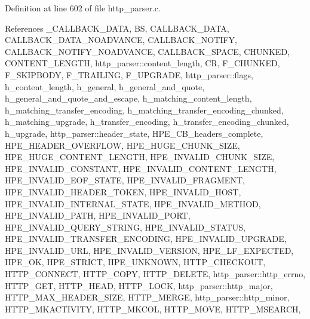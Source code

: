 Definition at line 602 of file http\+\_\+parser.\+c.



References \+\_\+\+C\+A\+L\+L\+B\+A\+C\+K\+\_\+\+D\+A\+TA, BS, C\+A\+L\+L\+B\+A\+C\+K\+\_\+\+D\+A\+TA, C\+A\+L\+L\+B\+A\+C\+K\+\_\+\+D\+A\+T\+A\+\_\+\+N\+O\+A\+D\+V\+A\+N\+CE, C\+A\+L\+L\+B\+A\+C\+K\+\_\+\+N\+O\+T\+I\+FY, C\+A\+L\+L\+B\+A\+C\+K\+\_\+\+N\+O\+T\+I\+F\+Y\+\_\+\+N\+O\+A\+D\+V\+A\+N\+CE, C\+A\+L\+L\+B\+A\+C\+K\+\_\+\+S\+P\+A\+CE, C\+H\+U\+N\+K\+ED, C\+O\+N\+T\+E\+N\+T\+\_\+\+L\+E\+N\+G\+TH, http\+\_\+parser\+::content\+\_\+length, CR, F\+\_\+\+C\+H\+U\+N\+K\+ED, F\+\_\+\+S\+K\+I\+P\+B\+O\+DY, F\+\_\+\+T\+R\+A\+I\+L\+I\+NG, F\+\_\+\+U\+P\+G\+R\+A\+DE, http\+\_\+parser\+::flags, h\+\_\+content\+\_\+length, h\+\_\+general, h\+\_\+general\+\_\+and\+\_\+quote, h\+\_\+general\+\_\+and\+\_\+quote\+\_\+and\+\_\+escape, h\+\_\+matching\+\_\+content\+\_\+length, h\+\_\+matching\+\_\+transfer\+\_\+encoding, h\+\_\+matching\+\_\+transfer\+\_\+encoding\+\_\+chunked, h\+\_\+matching\+\_\+upgrade, h\+\_\+transfer\+\_\+encoding, h\+\_\+transfer\+\_\+encoding\+\_\+chunked, h\+\_\+upgrade, http\+\_\+parser\+::header\+\_\+state, H\+P\+E\+\_\+\+C\+B\+\_\+headers\+\_\+complete, H\+P\+E\+\_\+\+H\+E\+A\+D\+E\+R\+\_\+\+O\+V\+E\+R\+F\+L\+OW, H\+P\+E\+\_\+\+H\+U\+G\+E\+\_\+\+C\+H\+U\+N\+K\+\_\+\+S\+I\+ZE, H\+P\+E\+\_\+\+H\+U\+G\+E\+\_\+\+C\+O\+N\+T\+E\+N\+T\+\_\+\+L\+E\+N\+G\+TH, H\+P\+E\+\_\+\+I\+N\+V\+A\+L\+I\+D\+\_\+\+C\+H\+U\+N\+K\+\_\+\+S\+I\+ZE, H\+P\+E\+\_\+\+I\+N\+V\+A\+L\+I\+D\+\_\+\+C\+O\+N\+S\+T\+A\+NT, H\+P\+E\+\_\+\+I\+N\+V\+A\+L\+I\+D\+\_\+\+C\+O\+N\+T\+E\+N\+T\+\_\+\+L\+E\+N\+G\+TH, H\+P\+E\+\_\+\+I\+N\+V\+A\+L\+I\+D\+\_\+\+E\+O\+F\+\_\+\+S\+T\+A\+TE, H\+P\+E\+\_\+\+I\+N\+V\+A\+L\+I\+D\+\_\+\+F\+R\+A\+G\+M\+E\+NT, H\+P\+E\+\_\+\+I\+N\+V\+A\+L\+I\+D\+\_\+\+H\+E\+A\+D\+E\+R\+\_\+\+T\+O\+K\+EN, H\+P\+E\+\_\+\+I\+N\+V\+A\+L\+I\+D\+\_\+\+H\+O\+ST, H\+P\+E\+\_\+\+I\+N\+V\+A\+L\+I\+D\+\_\+\+I\+N\+T\+E\+R\+N\+A\+L\+\_\+\+S\+T\+A\+TE, H\+P\+E\+\_\+\+I\+N\+V\+A\+L\+I\+D\+\_\+\+M\+E\+T\+H\+OD, H\+P\+E\+\_\+\+I\+N\+V\+A\+L\+I\+D\+\_\+\+P\+A\+TH, H\+P\+E\+\_\+\+I\+N\+V\+A\+L\+I\+D\+\_\+\+P\+O\+RT, H\+P\+E\+\_\+\+I\+N\+V\+A\+L\+I\+D\+\_\+\+Q\+U\+E\+R\+Y\+\_\+\+S\+T\+R\+I\+NG, H\+P\+E\+\_\+\+I\+N\+V\+A\+L\+I\+D\+\_\+\+S\+T\+A\+T\+US, H\+P\+E\+\_\+\+I\+N\+V\+A\+L\+I\+D\+\_\+\+T\+R\+A\+N\+S\+F\+E\+R\+\_\+\+E\+N\+C\+O\+D\+I\+NG, H\+P\+E\+\_\+\+I\+N\+V\+A\+L\+I\+D\+\_\+\+U\+P\+G\+R\+A\+DE, H\+P\+E\+\_\+\+I\+N\+V\+A\+L\+I\+D\+\_\+\+U\+RL, H\+P\+E\+\_\+\+I\+N\+V\+A\+L\+I\+D\+\_\+\+V\+E\+R\+S\+I\+ON, H\+P\+E\+\_\+\+L\+F\+\_\+\+E\+X\+P\+E\+C\+T\+ED, H\+P\+E\+\_\+\+OK, H\+P\+E\+\_\+\+S\+T\+R\+I\+CT, H\+P\+E\+\_\+\+U\+N\+K\+N\+O\+WN, H\+T\+T\+P\+\_\+\+C\+H\+E\+C\+K\+O\+UT, H\+T\+T\+P\+\_\+\+C\+O\+N\+N\+E\+CT, H\+T\+T\+P\+\_\+\+C\+O\+PY, H\+T\+T\+P\+\_\+\+D\+E\+L\+E\+TE, http\+\_\+parser\+::http\+\_\+errno, H\+T\+T\+P\+\_\+\+G\+ET, H\+T\+T\+P\+\_\+\+H\+E\+AD, H\+T\+T\+P\+\_\+\+L\+O\+CK, http\+\_\+parser\+::http\+\_\+major, H\+T\+T\+P\+\_\+\+M\+A\+X\+\_\+\+H\+E\+A\+D\+E\+R\+\_\+\+S\+I\+ZE, H\+T\+T\+P\+\_\+\+M\+E\+R\+GE, http\+\_\+parser\+::http\+\_\+minor, H\+T\+T\+P\+\_\+\+M\+K\+A\+C\+T\+I\+V\+I\+TY, H\+T\+T\+P\+\_\+\+M\+K\+C\+OL, H\+T\+T\+P\+\_\+\+M\+O\+VE, H\+T\+T\+P\+\_\+\+M\+S\+E\+A\+R\+CH, 
